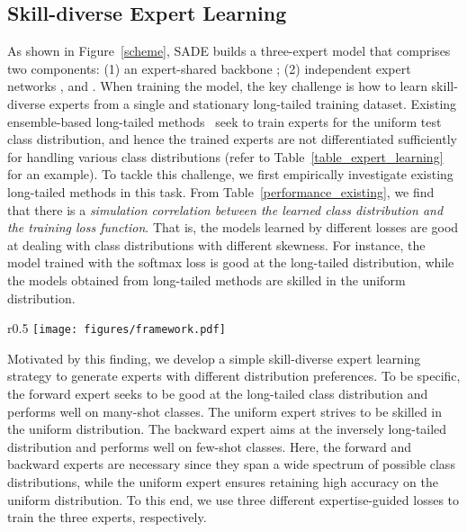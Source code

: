 \documentclass{article}
\begin{document}
 

 
 

\subsection{Skill-diverse Expert Learning}
\label{expert_learning}   

As shown in Figure~\ref{scheme}, SADE builds a three-expert model that comprises two components: (1) an expert-shared  backbone ; (2) independent expert networks   ,  and . When training the model, the key challenge is how to learn  skill-diverse experts from a single and  stationary long-tailed training dataset.
Existing ensemble-based long-tailed  methods~\cite{guo2021long,wang2020long} seek to  train experts for   the uniform test  class distribution, and hence the trained experts are not  differentiated sufficiently for handling various class distributions (refer to   Table~\ref{table_expert_learning} for an example). To tackle this challenge, we first empirically investigate existing long-tailed methods in this task. From Table~\ref{performance_existing}, we find   that  there is a \emph{simulation correlation between the learned class distribution and the training loss function}. That is, the models learned by different losses are good at dealing with   class distributions with different skewness. For instance, the model trained with the  softmax loss is good at   the long-tailed  distribution, while the models  obtained from  long-tailed methods are skilled in the uniform   distribution.   

  \begin{wrapfigure}{r}{0.5\textwidth} 
  \centering
  \vspace{-3pt}
\texttt{[image: figures/framework.pdf]}
  \vspace{-10pt}
  \caption{The scheme of SADE with  three experts, where different experts are trained with    different expertise-guided losses.
  }  \vspace{-9pt}
  \label{scheme}  
\end{wrapfigure} 


Motivated by this finding, we develop a simple  skill-diverse  expert learning strategy   to generate experts with different  distribution preferences. To be specific, the forward  expert  seeks to be good at the  long-tailed class distribution and performs well on many-shot classes. The uniform  expert  strives to be skilled in the  uniform  distribution. The backward  expert  aims at  the inversely long-tailed distribution and performs well on few-shot classes.
Here, the  forward and  backward experts are necessary since they span a wide spectrum of possible   class distributions, while the  uniform expert ensures  retaining high accuracy on the uniform   distribution. 
To this end, we use three different expertise-guided losses to train the three experts, respectively.
\end{document}
